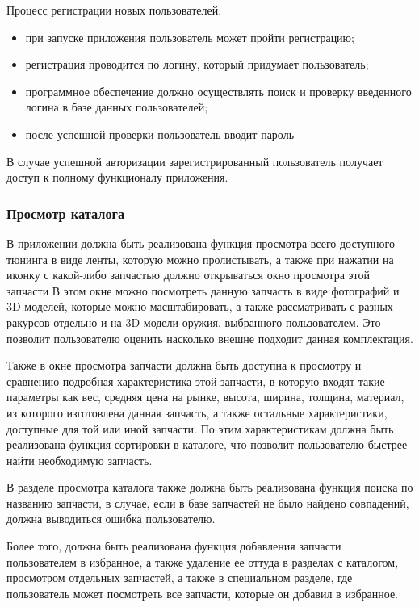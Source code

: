 \documentclass[14pt]{extreport}
\begin{document}
Процесс регистрации новых пользователей:
\begin{itemize}
	\item при запуске приложения пользователь может пройти регистрацию;
	\item регистрация проводится по логину, который придумает пользователь;
	\item программное обеспечение должно осуществлять поиск и проверку
введенного логина в базе данных пользователей;
	\item после успешной проверки пользователь вводит пароль
\end{itemize}

В случае успешной авторизации зарегистрированный пользователь получает доступ к полному функционалу приложения.

\subsubsection{Просмотр каталога}
В приложении должна быть реализована функция просмотра всего доступного тюнинга в виде ленты, которую можно пролистывать, а также при нажатии на иконку с какой-либо запчастью должно открываться окно просмотра этой запчасти В этом окне можно посмотреть данную запчасть в виде фотографий и 3D-моделей, которые можно масштабировать, а также рассматривать с разных ракурсов отдельно и на 3D-модели оружия, выбранного пользователем. Это позволит пользователю оценить насколько внешне подходит данная комплектация.

Также в окне просмотра запчасти должна быть доступна к просмотру и сравнению подробная характеристика этой запчасти, в которую входят такие параметры как вес, средняя цена на рынке, высота, ширина, толщина, материал, из которого изготовлена данная запчасть, а также остальные характеристики, доступные для той или иной запчасти. По этим характеристикам должна быть реализована функция сортировки в каталоге, что позволит пользователю быстрее найти необходимую запчасть.

В разделе просмотра каталога также должна быть реализована функция поиска по названию запчасти, в случае, если в базе запчастей не было найдено совпадений, должна выводиться ошибка пользователю. 

Более того, должна быть реализована функция добавления запчасти пользователем в избранное, а также удаление ее оттуда в разделах с каталогом, просмотром отдельных запчастей, а также в специальном разделе, где пользователь может посмотреть все запчасти, которые он добавил в избранное.
\end{document}
